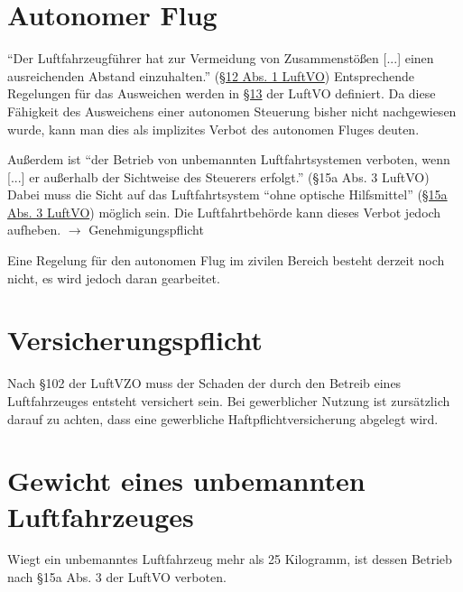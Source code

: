 \documentclass[letterpaper,11pt,ngerman]{andi}
\begin{document}
\section{Autonomer Flug}
\label{included_projects/rechtliches/RECHTLICHES_SPEC/content:autonomer-flug}\label{included_projects/rechtliches/RECHTLICHES_SPEC/content:autonomous}
``Der Luftfahrzeugführer hat zur Vermeidung von Zusammenstößen {[}...{]} einen ausreichenden Abstand einzuhalten.'' (\href{http://www.gesetze-im-internet.de/luftvo/\_\_12.html}{\S{}12 Abs. 1 LuftVO}) Entsprechende Regelungen für das Ausweichen werden in \href{http://www.gesetze-im-internet.de/luftvo/\_\_13.html}{\S{}13} der LuftVO definiert. Da diese Fähigkeit des Ausweichens einer autonomen Steuerung bisher nicht nachgewiesen wurde, kann man dies als implizites Verbot des autonomen Fluges deuten.

Außerdem ist ``der Betrieb von unbemannten Luftfahrtsystemen verboten, wenn {[}...{]} er außerhalb der Sichtweise des Steuerers erfolgt.'' (\S{}15a Abs. 3 LuftVO) Dabei muss die Sicht auf das Luftfahrtsystem ``ohne optische Hilfsmittel'' (\href{http://www.gesetze-im-internet.de/luftvo/\_\_15a.html}{\S{}15a Abs. 3 LuftVO}) möglich sein. Die Luftfahrtbehörde kann dieses Verbot jedoch aufheben. \(\rightarrow\) Genehmigungspflicht

Eine Regelung für den autonomen Flug im zivilen Bereich besteht derzeit noch nicht, es wird jedoch daran gearbeitet.


\section{Versicherungspflicht}
\label{included_projects/rechtliches/RECHTLICHES_SPEC/content:versicherungspflicht}\label{included_projects/rechtliches/RECHTLICHES_SPEC/content:a-abs-3-luftvo}
Nach \S{}102 der LuftVZO muss der Schaden der durch den Betreib eines Luftfahrzeuges entsteht versichert sein. Bei gewerblicher Nutzung ist zursätzlich darauf zu achten, dass eine gewerbliche Haftpflichtversicherung abgelegt wird.


\section{Gewicht eines unbemannten Luftfahrzeuges}
\label{included_projects/rechtliches/RECHTLICHES_SPEC/content:gewicht-eines-unbemannten-luftfahrzeuges}
Wiegt ein unbemanntes Luftfahrzeug mehr als 25 Kilogramm, ist dessen Betrieb nach \S{}15a Abs. 3 der LuftVO verboten.
\end{document}
